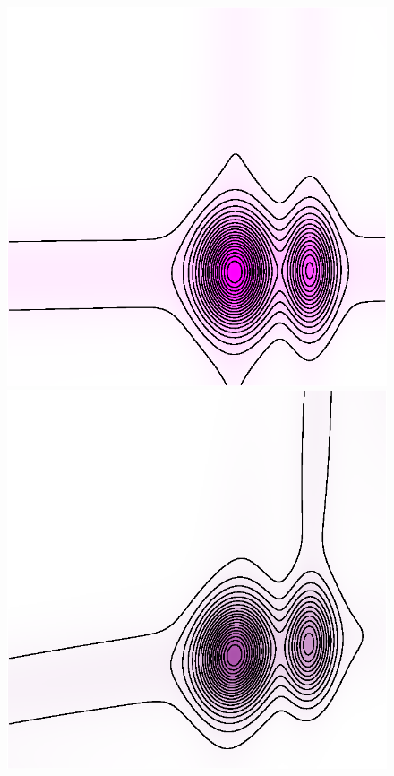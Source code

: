 \documentclass[cn,10pt,math=newtx,citestyle=gb7714-2015,bibstyle=gb7714-2015]{elegantbook}
\begin{document}
\begin{figure}[H]
\begin{minipage}{0.8\linewidth}
	\begin{minipage}{0.19\linewidth}
		\centering
		\begin{mdframed}
		    \includegraphics[width=\linewidth]{figure/fig4.4/evol-levelsets-1.eps}
		\end{mdframed}
	\end{minipage}
	\begin{minipage}{0.19\linewidth}
		\centering
		\begin{mdframed}
		    \includegraphics[width=\linewidth]{figure/fig4.4/evol-levelsets-17.eps}

\end{mdframed}
\end{minipage}
\end{minipage}
\end{figure}
\end{document}
